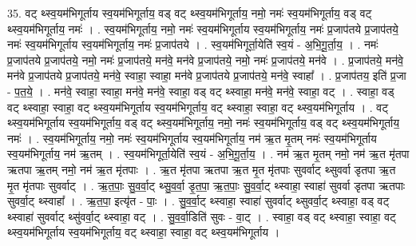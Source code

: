 \documentclass[17pt]{extarticle}
\begin{document}
35. वट् थ्स्व॒यम॑भिगूर्ताय स्व॒यम॑भिगूर्ताय॒ वड् वट् थ्स्व॒यम॑भिगूर्ताय॒ नमो॒ नमः॑ स्व॒यम॑भिगूर्ताय॒ वड् वट् थ्स्व॒यम॑भिगूर्ताय॒ नमः॑ । . स्व॒यम॑भिगूर्ताय॒ नमो॒ नमः॑ स्व॒यम॑भिगूर्ताय स्व॒यम॑भिगूर्ताय॒ नमः॑ प्र॒जाप॑तये प्र॒जाप॑तये॒ नमः॑ स्व॒यम॑भिगूर्ताय स्व॒यम॑भिगूर्ताय॒ नमः॑ प्र॒जाप॑तये । . स्व॒यम॑भिगूर्ता॒येति॑ स्व॒यं - अ॒भि॒गू॒र्ता॒य॒ । . नमः॑ प्र॒जाप॑तये प्र॒जाप॑तये॒ नमो॒ नमः॑ प्र॒जाप॑तये॒ मन॑वे॒ मन॑वे प्र॒जाप॑तये॒ नमो॒ नमः॑ प्र॒जाप॑तये॒ मन॑वे । . प्र॒जाप॑तये॒ मन॑वे॒ मन॑वे प्र॒जाप॑तये प्र॒जाप॑तये॒ मन॑वे॒ स्वाहा॒ स्वाहा॒ मन॑वे प्र॒जाप॑तये प्र॒जाप॑तये॒ मन॑वे॒ स्वाहा᳚ । . प्र॒जाप॑तय॒ इति॑ प्र॒जा - प॒त॒ये॒ । . मन॑वे॒ स्वाहा॒ स्वाहा॒ मन॑वे॒ मन॑वे॒ स्वाहा॒ वड् वट् थ्स्वाहा॒ मन॑वे॒ मन॑वे॒ स्वाहा॒ वट् । . स्वाहा॒ वड् वट् थ्स्वाहा॒ स्वाहा॒ वट् थ्स्व॒यम॑भिगूर्ताय स्व॒यम॑भिगूर्ताय॒ वट् थ्स्वाहा॒ स्वाहा॒ वट् थ्स्व॒यम॑भिगूर्ताय । . वट् थ्स्व॒यम॑भिगूर्ताय स्व॒यम॑भिगूर्ताय॒ वड् वट् थ्स्व॒यम॑भिगूर्ताय॒ नमो॒ नमः॑ स्व॒यम॑भिगूर्ताय॒ वड् वट् थ्स्व॒यम॑भिगूर्ताय॒ नमः॑ । . स्व॒यम॑भिगूर्ताय॒ नमो॒ नमः॑ स्व॒यम॑भिगूर्ताय स्व॒यम॑भिगूर्ताय॒ नम॑ ऋ॒त मृ॒तम् नमः॑ स्व॒यम॑भिगूर्ताय स्व॒यम॑भिगूर्ताय॒ नम॑ ऋ॒तम् । . स्व॒यम॑भिगूर्ता॒येति॑ स्व॒यं - अ॒भि॒गू॒र्ता॒य॒ । . नम॑ ऋ॒त मृ॒तम् नमो॒ नम॑ ऋ॒त मृ॑तपा ऋतपा ऋ॒तम् नमो॒ नम॑ ऋ॒त मृ॑तपाः । . ऋ॒त मृ॑तपा ऋतपा ऋ॒त मृ॒त मृ॑तपाः सुवर्वाट् थ्सुवर्वा डृतपा ऋ॒त मृ॒त मृ॑तपाः सुवर्वाट् । . ऋ॒त॒पाः॒ सु॒व॒र्वा॒ट् थ्सु॒व॒र्वा॒ डृ॒त॒पा॒ ऋ॒त॒पाः॒ सु॒व॒र्वा॒ट् थ्स्वाहा॒ स्वाहा॑ सुवर्वा डृतपा ऋतपाः सुवर्वा॒ट् थ्स्वाहा᳚ । . ऋ॒त॒पा॒ इत्यृ॑त - पाः॒ । . सु॒व॒र्वा॒ट् थ्स्वाहा॒ स्वाहा॑ सुवर्वाट् थ्सुवर्वा॒ट् थ्स्वाहा॒ वड् वट् थ्स्वाहा॑ सुवर्वाट् थ्सु॑वर्वा॒ट् थ्स्वाहा॒ वट् । . सु॒व॒र्वा॒डिति॑ सुवः - वा॒ट् । . स्वाहा॒ वड् वट् थ्स्वाहा॒ स्वाहा॒ वट् थ्स्व॒यम॑भिगूर्ताय स्व॒यम॑भिगूर्ताय॒ वट् थ्स्वाहा॒ स्वाहा॒ वट् थ्स्व॒यम॑भिगूर्ताय । \newline
\end{document}
